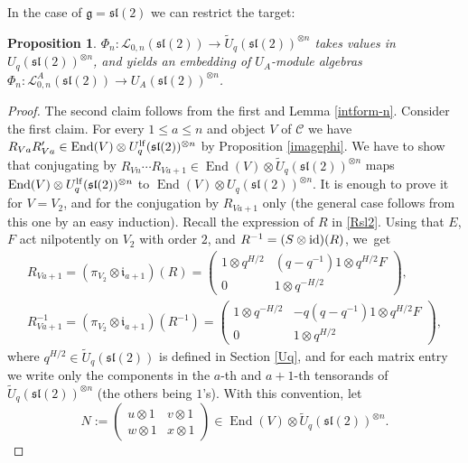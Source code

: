 \documentclass[pdftex]{sigma}%
\numberwithin{equation}{section}
\numberwithin{figure}{section}
\newtheorem{prop}[teo]{Proposition}
\newcommand{\Ll}{{\mathcal L}}
\newcommand{\ra}{\rightarrow}
\begin{document}
In the case of $\mathfrak{g}={\mathfrak{sl}}(2)$ we can restrict the target:
\begin{prop}\label{Alekseevsl2} $\Phi_n\colon \Ll_{0,n}({\mathfrak{sl}}(2))\ra \tilde U_q({\mathfrak{sl}}(2))^{{\otimes} n}$ takes values in $U_q({\mathfrak{sl}}(2))^{{\otimes} n}$, and yields an embedding of $U_A$-module algebras $\Phi_n\colon \Ll_{0,n}^A({\mathfrak{sl}}(2))\ra U_A({\mathfrak{sl}}(2))^{{\otimes} n}$.
\end{prop}
\begin{proof}
The second claim follows from the first and Lemma \ref{intform-n}. Consider the first claim. For every $1\leq a\leq n$ and object $V$ of $\mathcal{C}$ we have $R_{Va}R_{Va}' \in \operatorname{End}(V)\otimes U_q^{\rm lf}({\mathfrak{sl}}(2))^{\otimes n}$ by Proposition \ref{imagephi}. We have to show that conjugating by $R_{Vn}\cdots R_{Va+1}\in \operatorname{End}(V)\otimes \tilde U_q({\mathfrak{sl}}(2))^{{\otimes} n}$ maps $\operatorname{End}(V)\otimes U_q^{\rm lf}({\mathfrak{sl}}(2))^{\otimes n}$ to $\operatorname{End}(V)\otimes U_q({\mathfrak{sl}}(2))^{\otimes n}$. It is enough to prove it for $V=V_2$, and for the conjugation by $R_{Va+1}$ only (the general case follows from this one by an easy induction). Recall the expression of $R$ in \eqref{Rsl2}. Using that $E$, $F$ act nilpotently on $V_2$ with order $2$, and $R^{-1} = (S\otimes {\rm id} )(R)$, we~get
\begin{gather}
R_{Va+1} = (\pi_{V_2}\otimes \mathfrak{i}_{a+1})(R) = \begin{pmatrix} 1\otimes q^{H/2} & (q-q^{-1}) 1\otimes q^{H/2}F \\[.5ex] 0 & 1\otimes q^{-H/2}\end{pmatrix}\!, \label{1formRV2}
\\[.5ex]
R_{Va+1}^{-1} = (\pi_{V_2}\otimes \mathfrak{i}_{a+1})(R^{-1}) = \begin{pmatrix} 1\otimes q^{-H/2} & -q(q-q^{-1}) 1\otimes q^{H/2}F \\[.5ex] 0 & 1\otimes q^{H/2}\end{pmatrix}\!, \label{2formRV2}
\end{gather}
where $q^{H/2}\in \tilde U_q({\mathfrak{sl}}(2))$ is defined in Section \ref{Uq}, and for each matrix entry we write only the components in the $a$-th and $a+1$-th tensorands of $\tilde U_q({\mathfrak{sl}}(2))^{{\otimes} n}$ (the others being $1$'s). With this convention, let
\begin{equation}\label{defAmat}
 N := \begin{pmatrix} u \otimes 1 & v \otimes 1 \\ w \otimes 1 & x \otimes 1 \end{pmatrix} \in \operatorname{End}(V)\otimes \tilde U_q({\mathfrak{sl}}(2))^{{\otimes} n}.

\end{equation}
\end{proof}
\end{document}
